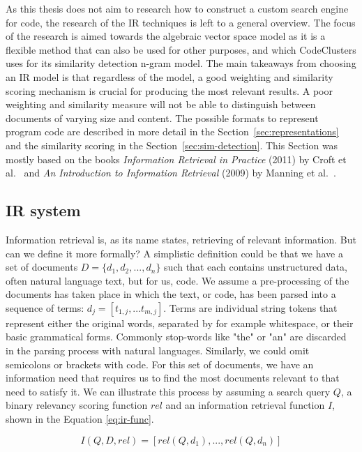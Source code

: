 As this thesis does not aim to research how to construct a custom search engine for code, the research of the IR techniques is left to a general overview. The focus of the research is aimed towards the algebraic vector space model as it is a flexible method that can also be used for other purposes, and which CodeClusters uses for its similarity detection n-gram model. The main takeaways from choosing an IR model is that regardless of the model, a good weighting and similarity scoring mechanism is crucial for producing the most relevant results. A poor weighting and similarity measure will not be able to distinguish between documents of varying size and content. The possible formats to represent program code are described in more detail in the Section~\ref{sec:representations} and the similarity scoring in the Section~\ref{sec:sim-detection}. This Section was mostly based on the books \textit{Information Retrieval in Practice} (2011) by Croft et al.~\cite{ir-in-practise} and \textit{An Introduction to Information Retrieval} (2009) by Manning et al.~\cite{intro-to-ir}.

\subsection{IR system}
\label{ssec:ir-system}

Information retrieval is, as its name states, retrieving of relevant information. But can we define it more formally? A simplistic definition could be that we have a set of documents $D=\{d_1, d_2, ..., d_n\}$ such that each contains unstructured data, often natural language text, but for us, code. We assume a pre-processing of the documents has taken place in which the text, or code, has been parsed into a sequence of terms: $d_j=[t_{1,j}, ... t_{m,j}]$. Terms are individual string tokens that represent either the original words, separated by for example whitespace, or their basic grammatical forms. Commonly stop-words like "the" or "an" are discarded in the parsing process with natural languages. Similarly, we could omit semicolons or brackets with code. For this set of documents, we have an information need that requires us to find the most documents relevant to that need to satisfy it. We can illustrate this process by assuming a search query $Q$, a binary relevancy scoring function $rel$ and an information retrieval function $I$, shown in the Equation \ref{eq:ir-func}.

\vspace{-6pt}
\begin{equation}
\label{eq:ir-func}
I(Q,D,rel)=[rel(Q, d_1), ...,  rel(Q, d_n)]
\end{equation}

